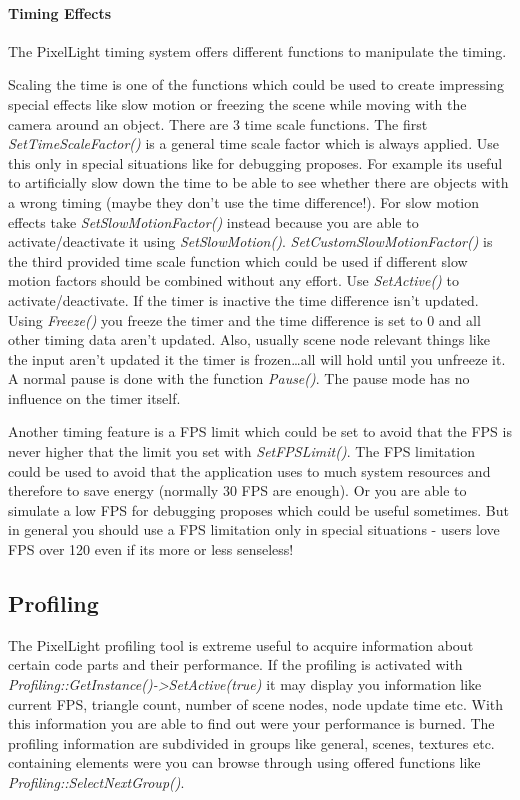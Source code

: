 \paragraph{Timing Effects}
The PixelLight timing system offers different functions to manipulate the timing.

Scaling the time is one of the functions which could be used to create impressing special effects like slow motion or freezing the scene while moving with the camera around an object. There are 3 time scale functions. The first \emph{SetTimeScaleFactor()} is a general time scale factor which is always applied. Use this only in special situations like for debugging proposes. For example its useful to artificially slow down the time to be able to see whether there are objects with a wrong timing (maybe they don't use the time difference!). For slow motion effects take \emph{SetSlowMotionFactor()} instead because you are able to activate/deactivate it using \emph{SetSlowMotion()}. \emph{SetCustomSlowMotionFactor()} is the third provided time scale function which could be used if different slow motion factors should be combined without any effort. Use \emph{SetActive()} to activate/deactivate. If the timer is inactive the time difference isn't updated. Using \emph{Freeze()} you freeze the timer and the time difference is set to 0 and all other timing data aren't updated. Also, usually scene node relevant things like the input aren't updated it the timer is frozen\ldots all will hold until you unfreeze it. A normal pause is done with the function \emph{Pause()}. The pause mode has no influence on the timer itself.

Another timing feature is a \ac{FPS} limit which could be set to avoid that the \ac{FPS} is never higher that the limit you set with \emph{SetFPSLimit()}. The \ac{FPS} limitation could be used to avoid that the application uses to much system resources and therefore to save energy (normally 30 \ac{FPS} are enough). Or you are able to simulate a low \ac{FPS} for debugging proposes which could be useful sometimes. But in general you should use a \ac{FPS} limitation only in special situations - users love \ac{FPS} over 120 even if its more or less senseless!





\subsection{Profiling}
The PixelLight profiling tool is extreme useful to acquire information about certain code parts and their performance. If the profiling is activated with \emph{Profiling::GetInstance()->SetActive(true)} it may display you information like current \ac{FPS}, triangle count, number of scene nodes, node update time etc. With this information you are able to find out were your performance is burned. The profiling information are subdivided in groups like general, scenes, textures etc. containing elements were you can browse through using offered functions like \emph{Profiling::SelectNextGroup()}.

